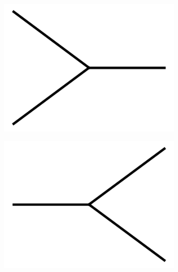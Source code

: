 \documentclass[11pt,a4paper,twoside,pdf]{article}
\numberwithin{equation}{section}
\begin{document}
\begin{figure}[h!]
{{          \raisebox{0.9\height}{\LARGE $+$}\quad
          \begin{subfigure}[t]{.08\textwidth}
            \includegraphics[width=\textwidth]{plots/1to2.png}
          \end{subfigure}%
          \begin{subfigure}[t]{.08\textwidth}
            \includegraphics[width=\textwidth]{plots/2to1.png}
          \end{subfigure}%
                    \quad %
          \raisebox{0.9\height}{\LARGE $+$}\quad
          \begin{subfigure}[t]{.08\textwidth}

\end{subfigure}}}
\end{figure}
\end{document}
